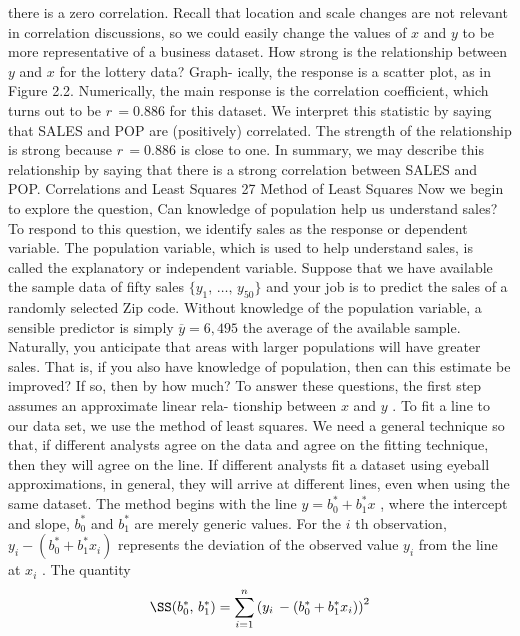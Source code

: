 \documentclass[11pt]{article}
\begin{document}
 there is a zero correlation. Recall that location and scale changes are not relevant
in correlation discussions, so we could easily change the values of \(x\) and \(y\) to be
 more representative of a business dataset.
How strong is the relationship between \(y\) and \(x\) for the lottery data? Graph-
ically, the response is a scatter plot, as in Figure 2.2. Numerically, the main
response is the correlation coefficient, which turns out to be \(r \,=0 . 8 8 6\) for this
dataset. We interpret this statistic by saying that SALES and POP are (positively)
correlated. The strength of the relationship is strong because \(r \,=0 . 8 8 6\) is close
to one. In summary, we may describe this relationship by saying that there is a
 strong correlation between SALES and POP.
 Correlations and Least Squares 27
 Method of Least Squares
Now we begin to explore the question, Can knowledge of population help us
understand sales? To respond to this question, we identify sales as the response
or dependent variable. The population variable, which is used to help understand
 sales, is called the explanatory or independent variable.
 Suppose that we have available the sample data of fifty sales \(\{y_{1} , \, \ldots, \, y_{5 0} \}\)
and your job is to predict the sales of a randomly selected Zip code. Without
 knowledge of the population variable, a sensible predictor is simply \(\overline{{y}}=6 , 4 9 5\)
the average of the available sample. Naturally, you anticipate that areas with
 larger populations will have greater sales. That is, if you also have knowledge of
population, then can this estimate be improved? If so, then by how much?
To answer these questions, the first step assumes an approximate linear rela-
tionship between \(x\) and \(y\) . To fit a line to our data set, we use the method of
 least squares. We need a general technique so that, if different analysts agree on
the data and agree on the fitting technique, then they will agree on the line. If
 different analysts fit a dataset using eyeball approximations, in general, they will
 arrive at different lines, even when using the same dataset.
 The method begins with the line \(y=b_{0}^{*}+b_{1}^{*} x\) , where the intercept and slope,
\(b_{0}^{*}\) and \(b_{1}^{*}\) are merely generic values. For the \(i\) th observation, \(y_{i}-\left( b_{0}^{*}+b_{1}^{*} x_{i} \right)\)
represents the deviation of the observed value \(y_{i}\) from the line at \(x_{i}\) . The
quantity
\[
\SS( b_{0}^{\ast} , \, b_{1}^{\ast} )=\sum_{i=1}^{n} \left( y_{i} \,-\left( b_{0}^{\ast}+b_{1}^{\ast} x_{i} \right) \right)^{2}
\]
\end{document}
